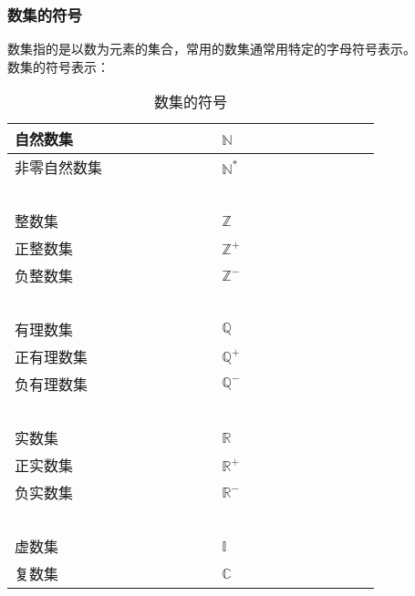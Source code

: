 \documentclass[UTF8]{ctexart}
\begin{document}
\subsubsection{数集的符号}
    数集指的是以数为元素的集合，常用的数集通常用特定的字母符号表示。\\[3mm]
    数集的符号表示：
    \begin{table}[h]
        \begin{center}
            \begin{tabular}{l|l}
                \hline
                自然数集~~~~~~~~~~~~~~~~&$\mathbb{N}$~~~~~~~~~~~~~~~~\\ \hline
                非零自然数集&$\mathbb{N^*}$\\ \hline
                ~&~\\ \hline
                整数集&$\mathbb{Z}$\\ \hline
                正整数集&$\mathbb{Z^+}$\\ \hline
                负整数集&$\mathbb{Z^-}$\\ \hline
                ~&~\\ \hline
                有理数集&$\mathbb{Q}$\\ \hline
                正有理数集&$\mathbb{Q^+}$\\ \hline
                负有理数集&$\mathbb{Q^-}$\\ \hline
                ~&~\\ \hline
                实数集&$\mathbb{R}$\\ \hline
                正实数集&$\mathbb{R^+}$\\ \hline
                负实数集&$\mathbb{R^-}$\\ \hline
                ~&~\\ \hline
                虚数集&$\mathbb{I}$\\ \hline
                复数集&$\mathbb{C}$\\ \hline
            \end{tabular}
        \end{center}
        \caption{数集的符号}
    \end{table}

\newpage
\end{document}
